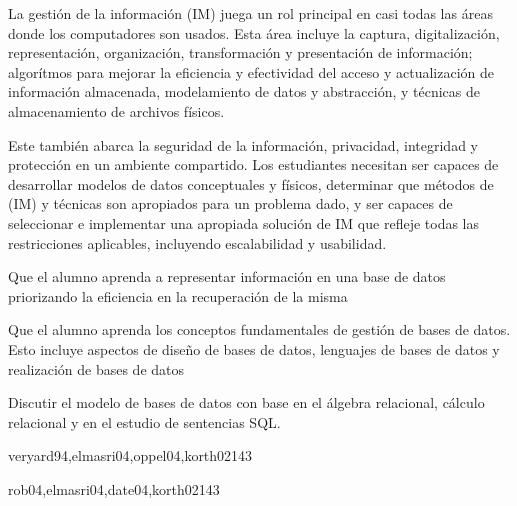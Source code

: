 \begin{syllabus}


\begin{justification}
La gestión de la información (IM) juega un rol principal en casi todas las áreas donde los computadores son usados. Esta área incluye la captura, digitalización, representación, organización, transformación y presentación de información; algorítmos para mejorar la eficiencia y efectividad del acceso y actualización de información almacenada, modelamiento de datos y abstracción, y técnicas de almacenamiento de archivos físicos.

Este también abarca la seguridad de la información, privacidad, integridad y protección en un ambiente compartido. Los estudiantes necesitan ser capaces de desarrollar modelos de datos conceptuales y físicos, determinar que métodos de (IM) y técnicas son apropiados para un problema dado, y ser capaces de seleccionar e implementar una apropiada solución de IM que refleje todas las restricciones aplicables, incluyendo escalabilidad y usabilidad.
\end{justification}

\begin{goals}
\item Que el alumno aprenda a representar información en una base de datos priorizando la eficiencia en la recuperación de la misma
\item Que el alumno aprenda los conceptos fundamentales de gestión de bases de datos. Esto incluye aspectos de diseño de bases de datos, lenguajes de bases de datos y realización de bases de datos
\item Discutir el modelo de bases de datos con base en el álgebra relacional, cálculo relacional y en el estudio de sentencias SQL.
\end{goals}

\begin{outcomes}
\end{outcomes}

\begin{unit}{\IMInformationModelsDef}{veryard94,elmasri04,oppel04,korth02}{14}{3}
    \IMInformationModelsAllTopics
    \IMInformationModelsAllObjectives
\end{unit}

\begin{unit}{\IMDatabaseSystemsDef}{rob04,elmasri04,date04,korth02}{14}{3}
    \IMDatabaseSystemsAllTopics
    \IMDatabaseSystemsAllObjectives
\end{unit}


\end{syllabus}
